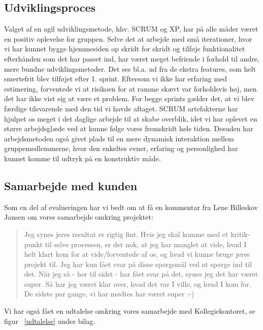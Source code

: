 \documentclass[12pt, a4paper]{report}
\begin{document}
\subsection{Udviklingsproces}
Valget af en agil udviklingsmetode, hhv. SCRUM og XP, har på alle måder været en positiv oplevelse for gruppen. Selve det at arbejde med små iterationer, hvor vi har kunnet bygge hjemmesiden op skridt for skridt og tilføje funktionalitet efterhånden som det har passet ind, har været meget befriende i forhold til andre, mere bundne udviklingsmetoder. Det ses bl.a. ud fra de ekstra features, som helt smertefrit blev tilføjet efter 1. sprint.
Eftersom vi ikke har erfaring med estimering, forventede vi at risikoen for at ramme skævt var forholdsvis høj, men det har ikke vist sig at være et problem. For begge sprints gælder det, at vi blev færdige tilsvarende med den tid vi havde aftaget.
SCRUM artefakterne har hjulpet os meget i det daglige arbejde til at skabe overblik, idet vi har oplevet en større arbejdsglæde ved at kunne følge vores fremskridt hele tiden.
Desuden har arbejdsmetoden også givet plads til en mere dynamisk interaktion mellem gruppemedlemmerne, hvor den enkeltes evner, erfaring og personlighed har kunnet komme til udtryk på en konstruktiv måde.

\subsection{Samarbejde med kunden}
Som en del af evalueringen har vi bedt om at få en kommentar fra Lene Billeskov Jansen om vores samarbejde omkring projektet:
\begin{quote}
Jeg synes jeres resultat er rigtig fint. Hvis jeg skal komme med et kritik-punkt til selve processen, er det nok, at jeg har manglet at vide, hvad I helt klart kom for at vide/forventede af os, og hvad vi kunne bruge jeres projekt til. Jeg har kun fået svar på disse spørgsmål ved at spørge ind til det. Når jeg så - her til sidst - har fået svar på det, synes jeg det har været super. Så har jeg været klar over, hvad det var I ville, og hvad I kom for. De sidste par gange, vi har mødtes har været super :-)
\end{quote}
Vi har også fået en udtalelse omkring vores samarbejde med Kollegiekontoret, se figur ~\ref{udtalelse} under bilag.
\end{document}
